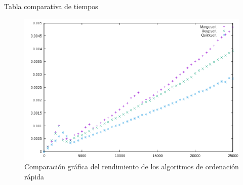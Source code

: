 \documentclass{article}
\begin{document}
		\begin{center}
		\tiny Tabla comparativa de tiempos
		\end{center}
		\begin{figure}[H]
		\centering
		\includegraphics[totalheight=8cm]{img/ordenacion_rapida}
		\caption{Comparación gráfica del rendimiento de los algoritmos de ordenación rápida}
		\label{fig:ordenacion_rapida}
		\end{figure}
		\
\end{document}
